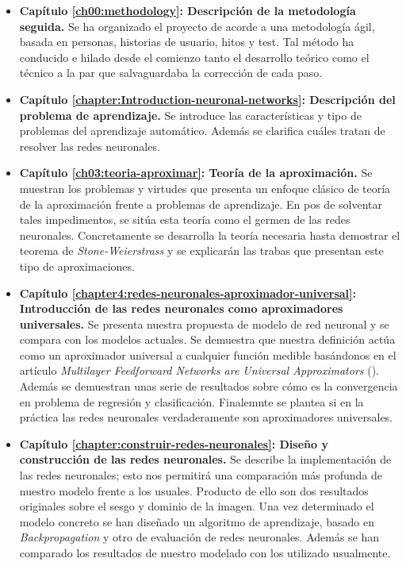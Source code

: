 \begin{itemize}
    \item \textbf{Capítulo \ref{ch00:methodology}: Descripción de la metodología seguida.} Se ha organizado el proyecto de acorde a una metodología ágil, basada en personas, historias de usuario, hitos y test. Tal método ha conducido e hilado desde el comienzo tanto el desarrollo teórico como el técnico a la par que  salvaguardaba la corrección de cada paso. 
    \item \textbf{Capítulo \ref{chapter:Introduction-neuronal-networks}: Descripción del problema de aprendizaje.} Se introduce las características y tipo de problemas del aprendizaje automático. Además se clarifica cuáles tratan de resolver las redes neuronales. 
    \item \textbf{Capítulo \ref{ch03:teoria-aproximar}: Teoría de la aproximación.} Se muestran los problemas y virtudes que presenta un enfoque clásico  de teoría de la aproximación frente a problemas de aprendizaje. En pos de solventar tales impedimentos,  
    se sitúa esta teoría como el germen de 
    las redes neuronales.
    Concretamente se desarrolla la teoría necesaria hasta demostrar el teorema de \textit{Stone-Weierstrass} y se explicarán las trabas que presentan este tipo de aproximaciones. 
    \item \textbf{Capítulo \ref{chapter4:redes-neuronales-aproximador-universal}: Introducción de las redes neuronales como aproximadores universales.} Se presenta nuestra propuesta de modelo de red neuronal y se compara con los modelos actuales. Se demuestra que nuestra definición actúa como un aproximador universal a cualquier función medible basándonos en el artículo 
    \textit{Multilayer Feedforward Networks are Universal Approximators} (\cite{HORNIK1989359}). Además se demuestran unas serie de resultados sobre cómo es la convergencia en problema de regresión y clasificación. Finalemnte se plantea si en la práctica las redes neuronales 
    verdaderamente son aproximadores universales.
    \item \textbf{Capítulo \ref{chapter:construir-redes-neuronales}: Diseño y construcción de las redes neuronales.} Se describe la implementación de las redes neuronales; esto nos permitirá una comparación  
    más profunda de nuestro modelo frente a los usuales. Producto de ello son dos resultados originales sobre el sesgo y dominio de la imagen. 
    Una vez determinado el modelo concreto se
    han diseñado un algoritmo de aprendizaje, basado en \textit{Backpropagation} y otro de evaluación de redes neuronales. Además se han comparado los resultados de nuestro modelado con los utilizado usualmente. 

\end{itemize}
